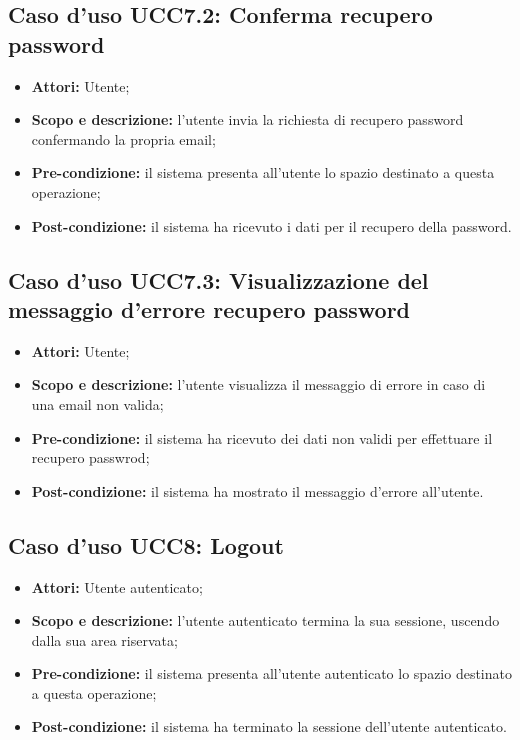 \subsection{Caso d'uso UCC7.2: Conferma recupero password}

\begin{itemize}
\item \textbf{Attori:} Utente;
\item \textbf{Scopo e descrizione:} l'utente invia la richiesta di recupero password confermando la propria email;
\item \textbf{Pre-condizione:} il sistema presenta all'utente lo spazio destinato a questa operazione;
\item \textbf{Post-condizione:} il sistema ha ricevuto i dati per il recupero della password.
\end{itemize}

\subsection{Caso d'uso UCC7.3: Visualizzazione del messaggio d'errore recupero password}

\begin{itemize}
\item \textbf{Attori:} Utente;
\item \textbf{Scopo e descrizione:} l'utente visualizza il messaggio di errore in caso di una email non valida;
\item \textbf{Pre-condizione:} il sistema ha ricevuto dei dati non validi per effettuare il recupero passwrod;
\item \textbf{Post-condizione:} il sistema ha mostrato il messaggio d'errore all'utente.
\end{itemize}

\subsection{Caso d'uso UCC8: Logout}

\begin{itemize}
\item \textbf{Attori:} Utente autenticato;
\item \textbf{Scopo e descrizione:} l'utente autenticato termina la sua sessione, uscendo dalla sua area riservata;
\item \textbf{Pre-condizione:} il sistema presenta all'utente autenticato lo spazio destinato a questa operazione;
\item \textbf{Post-condizione:} il sistema ha terminato la sessione dell'utente autenticato.
\end{itemize}

